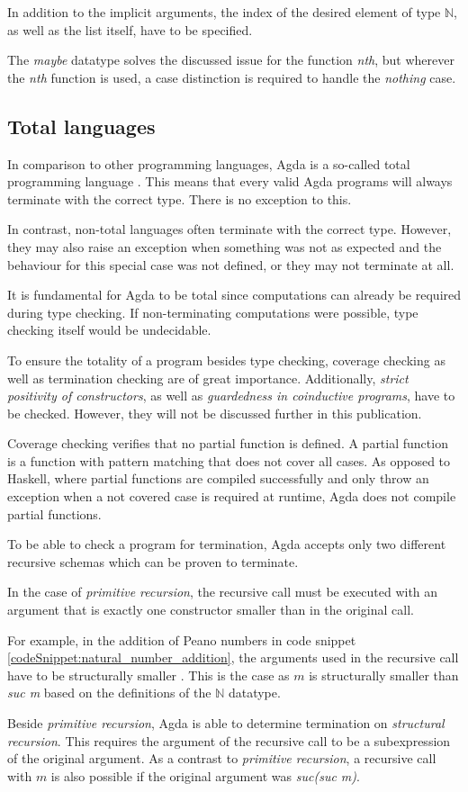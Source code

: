 In addition to the implicit arguments, the index of the desired element of type $\mathbb{N}$, as well as the list itself, have to be specified.

The \emph{maybe} datatype solves the discussed issue for the function \emph{nth}, but wherever the \emph{nth} function is used, a case distinction is required to handle the \emph{nothing} case.

\subsection{Total languages}\label{section:total_languages}
In comparison to other programming languages, Agda is a so-called total programming language \cite{AgdaReadTheDocs}.
This means that every valid Agda programs will always terminate with the correct type. There is no exception to this.

In contrast, non-total languages often terminate with the correct type. 
However, they may also raise an exception when something was not as expected and the behaviour for this special case was not defined, or they may not terminate at all.

It is fundamental for Agda to be total since computations can already be required during type checking.
If non-terminating computations were possible, type checking itself would be undecidable\cite{agda_wiki_totality}.

To ensure the totality of a program besides type checking, coverage checking as well as termination checking are of great importance. 
Additionally, \emph{strict positivity of constructors}, as well as \emph{guardedness in coinductive programs}, have to be checked. However, they will not be discussed further in this publication.

Coverage checking verifies that no partial function is defined. A partial function is a function with pattern matching that does not cover all cases.
As opposed to Haskell, where partial functions are compiled successfully and only throw an exception when a not covered case is required at runtime, Agda does not compile partial functions.

To be able to check a program for termination, Agda accepts only two different recursive schemas which can be proven to terminate.

In the case of \emph{primitive recursion}, the recursive call must be executed with an argument that is exactly one constructor smaller than in the original call.

For example, in the addition of Peano numbers in code snippet \ref{codeSnippet:natural_number_addition}, the arguments used in the recursive call have to be structurally smaller \cite{norell:deptyped}. 
This is the case as $m$ is structurally smaller than \emph{suc m} based on the definitions of the $\mathbb{N}$ datatype.

Beside \emph{primitive recursion}, Agda is able to determine termination on \emph{structural recursion}.
This requires the argument of the recursive call to be a subexpression of the original argument.
As a contrast to \emph{primitive recursion}, a recursive call with $m$ is also possible if the original argument was \emph{suc(suc m)}.